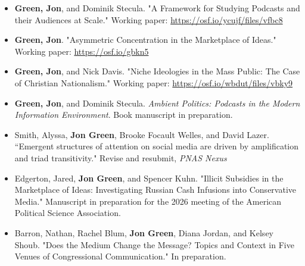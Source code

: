 \documentclass{article}
\begin{document}
\begin{itemize}

\item \textbf{Green, Jon}, and Dominik Stecula. "A Framework for Studying Podcasts and their Audiences at Scale." Working paper: \url{https://osf.io/ycujf/files/vfbc8}

\item \textbf{Green, Jon}. "Asymmetric Concentration in the Marketplace of Ideas." Working paper: \url{https://osf.io/gbkn5}

\item \textbf{Green, Jon}, and Nick Davis. "Niche Ideologies in the Mass Public: The Case of Christian Nationalism." Working paper: \url{https://osf.io/wbdut/files/vbky9}

\item \textbf{Green, Jon}, and Dominik Stecula. \textit{Ambient Politics: Podcasts in the Modern Information Environment}. Book manuscript in preparation.

\item Smith, Alyssa, \textbf{Jon Green}, Brooke Focault Welles, and David Lazer. ``Emergent structures of attention on social media are driven by amplification and triad transitivity." Revise and resubmit, \textit{PNAS Nexus}

\item Edgerton, Jared, \textbf{Jon Green}, and Spencer Kuhn. "Illicit Subsidies in the Marketplace of Ideas: Investigating Russian Cash Infusions into Conservative Media." Manuscript in preparation for the 2026 meeting of the American Political Science Association.

\item Barron, Nathan, Rachel Blum, \textbf{Jon Green}, Diana Jordan, and Kelsey Shoub. "Does the Medium Change the Message? Topics and Context in Five Venues of Congressional Communication." In preparation.

\end{itemize}
\end{document}
